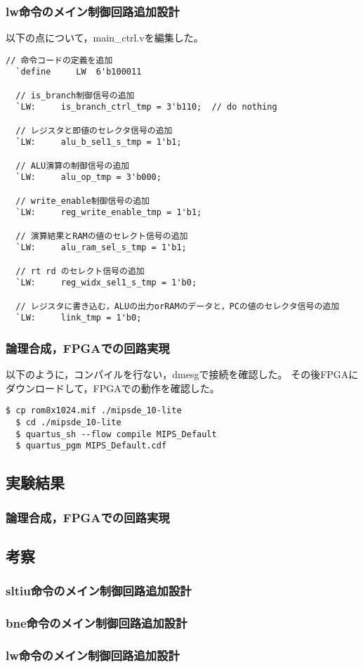 \subsubsection{lw命令のメイン制御回路追加設計}
以下の点について，main\_ctrl.vを編集した。
\begin{lstlisting}[caption={lw命令の追加設計},label={lw命令の追加設計}]
  // 命令コードの定義を追加
  `define     LW  6'b100011

  // is_branch制御信号の追加
  `LW:     is_branch_ctrl_tmp = 3'b110;  // do nothing
  
  // レジスタと即値のセレクタ信号の追加
  `LW:     alu_b_sel1_s_tmp = 1'b1;

  // ALU演算の制御信号の追加
  `LW:     alu_op_tmp = 3'b000;

  // write_enable制御信号の追加
  `LW:     reg_write_enable_tmp = 1'b1;

  // 演算結果とRAMの値のセレクト信号の追加
  `LW:     alu_ram_sel_s_tmp = 1'b1;

  // rt rd のセレクト信号の追加
  `LW:     reg_widx_sel1_s_tmp = 1'b0;

  // レジスタに書き込む，ALUの出力orRAMのデータと，PCの値のセレクタ信号の追加
  `LW:     link_tmp = 1'b0;
\end{lstlisting}

\subsubsection{論理合成，FPGAでの回路実現}
以下のように，コンパイルを行ない，dmesgで接続を確認した。
その後FPGAにダウンロードして，FPGAでの動作を確認した。

\begin{lstlisting}[caption={コンパイル，ダウンロード},label={コンパイル，ダウンロード4-2}]
  $ cp rom8x1024.mif ./mipsde_10-lite
  $ cd ./mipsde_10-lite
  $ quartus_sh --flow compile MIPS_Default
  $ quartus_pgm MIPS_Default.cdf 
\end{lstlisting}

\subsection{実験結果}
\subsubsection{論理合成，FPGAでの回路実現}


\subsection{考察}
\subsubsection{sltiu命令のメイン制御回路追加設計}
\subsubsection{bne命令のメイン制御回路追加設計}
\subsubsection{lw命令のメイン制御回路追加設計}
